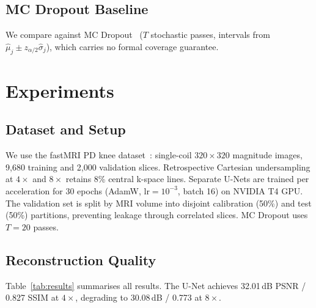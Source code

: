 \documentclass[runningheads]{llncs}
\begin{document}
\subsection{MC Dropout Baseline}
\label{sec:mcdropout}

We compare against MC Dropout~\cite{gal2016dropout} ($T$ stochastic passes, intervals from $\hat{\mu}_j \pm z_{\alpha/2}\hat{\sigma}_j$), which carries no formal coverage guarantee.

\section{Experiments}

\subsection{Dataset and Setup}

We use the fastMRI PD knee dataset~\cite{zbontar2018fastmri}: single-coil $320{\times}320$ magnitude images, 9{,}680 training and 2{,}000 validation slices. Retrospective Cartesian undersampling at $4{\times}$ and $8{\times}$ retains 8\% central k-space lines. Separate U-Nets are trained per acceleration for 30 epochs (AdamW, $\text{lr}{=}10^{-3}$, batch 16) on NVIDIA T4 GPU. The validation set is split by MRI volume into disjoint calibration (50\%) and test (50\%) partitions, preventing leakage through correlated slices. MC Dropout uses $T{=}20$ passes.

\subsection{Reconstruction Quality}

Table~\ref{tab:results} summarises all results. The U-Net achieves 32.01\,dB PSNR / 0.827 SSIM at $4{\times}$, degrading to 30.08\,dB / 0.773 at $8{\times}$.
\end{document}
